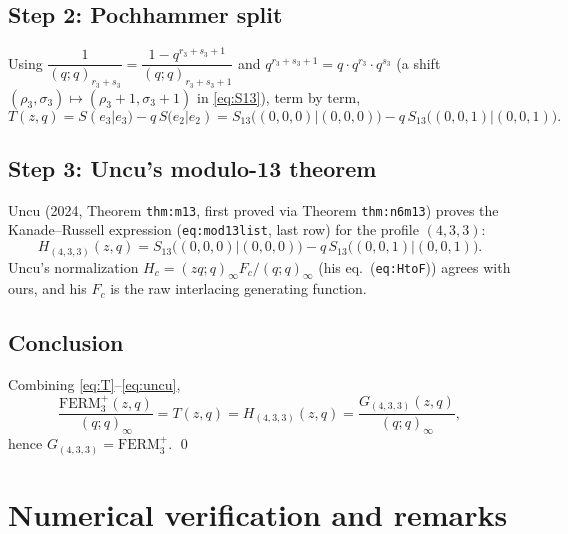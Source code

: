 \documentclass[11pt]{article}
\newcommand{\poch}[1]{(q;q)_{#1}}
\begin{document}
\subsection*{Step 2: Pochhammer split}
Using $\dfrac{1}{\poch{r_3+s_3}}=\dfrac{1-q^{r_3+s_3+1}}{\poch{r_3+s_3+1}}$
and $q^{r_3+s_3+1}=q\cdot q^{r_3}\cdot q^{s_3}$ (a shift
$(\rho_3,\sigma_3)\mapsto(\rho_3+1,\sigma_3+1)$ in \eqref{eq:S13}),
term by term,
\begin{equation}\label{eq:split}
T(z,q)=S(e_3|e_3)-q\,S(e_2|e_2)
     =S_{13}\bigl((0,0,0)|(0,0,0)\bigr)-q\,S_{13}\bigl((0,0,1)|(0,0,1)\bigr).
\end{equation}

\subsection*{Step 3: Uncu's modulo-13 theorem}
Uncu (2024, Theorem \texttt{thm:m13}, first proved via Theorem
\texttt{thm:n6m13}) proves the Kanade--Russell expression
(\texttt{eq:mod13list}, last row) for the profile $(4,3,3)$:
\begin{equation}\label{eq:uncu}
H_{(4,3,3)}(z,q)=
S_{13}\bigl((0,0,0)|(0,0,0)\bigr)-q\,S_{13}\bigl((0,0,1)|(0,0,1)\bigr).
\end{equation}
Uncu's normalization $H_c=(zq;q)_\infty F_c/(q;q)_\infty$
(his eq.\ (\texttt{eq:HtoF})) agrees with ours, and his $F_c$ is the raw
interlacing generating function.

\subsection*{Conclusion}
Combining \eqref{eq:T}--\eqref{eq:uncu},
\[
\frac{\mathrm{FERM}^{+}_3(z,q)}{(q;q)_\infty}=T(z,q)=H_{(4,3,3)}(z,q)
=\frac{G_{(4,3,3)}(z,q)}{(q;q)_\infty},
\]
hence $G_{(4,3,3)}=\mathrm{FERM}^{+}_3$. \qed

\section{Numerical verification and remarks}
\end{document}
